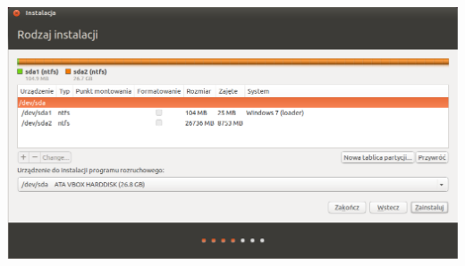 \begin{center}
        \includegraphics[width=\linewidth]{images/instalator_partycjonowanie_gparted2_czysty.png}
\end{center}


